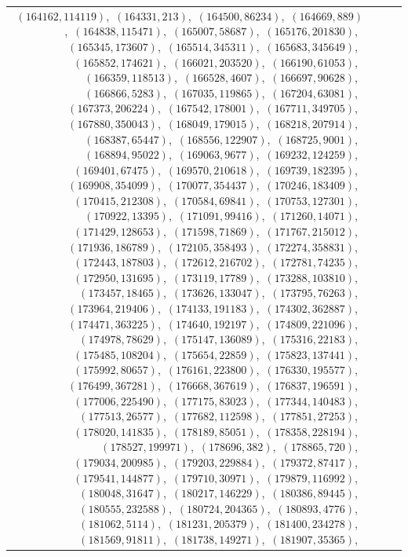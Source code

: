 \documentclass[11pt]{article}
\begin{document}
\begin{longtable}{@{}rrl>{\raggedright\arraybackslash}p{}@{}}
$(164162,114119)$,\allowbreak\ $(164331,213)$,\allowbreak\ $(164500,86234)$,\allowbreak\ $(164669,889)$,\allowbreak\ $(164838,115471)$,\allowbreak\ $(165007,58687)$,\allowbreak\ $(165176,201830)$,\allowbreak\ $(165345,173607)$,\allowbreak\ $(165514,345311)$,\allowbreak\ $(165683,345649)$,\allowbreak\ $(165852,174621)$,\allowbreak\ $(166021,203520)$,\allowbreak\ $(166190,61053)$,\allowbreak\ $(166359,118513)$,\allowbreak\ $(166528,4607)$,\allowbreak\ $(166697,90628)$,\allowbreak\ $(166866,5283)$,\allowbreak\ $(167035,119865)$,\allowbreak\ $(167204,63081)$,\allowbreak\ $(167373,206224)$,\allowbreak\ $(167542,178001)$,\allowbreak\ $(167711,349705)$,\allowbreak\ $(167880,350043)$,\allowbreak\ $(168049,179015)$,\allowbreak\ $(168218,207914)$,\allowbreak\ $(168387,65447)$,\allowbreak\ $(168556,122907)$,\allowbreak\ $(168725,9001)$,\allowbreak\ $(168894,95022)$,\allowbreak\ $(169063,9677)$,\allowbreak\ $(169232,124259)$,\allowbreak\ $(169401,67475)$,\allowbreak\ $(169570,210618)$,\allowbreak\ $(169739,182395)$,\allowbreak\ $(169908,354099)$,\allowbreak\ $(170077,354437)$,\allowbreak\ $(170246,183409)$,\allowbreak\ $(170415,212308)$,\allowbreak\ $(170584,69841)$,\allowbreak\ $(170753,127301)$,\allowbreak\ $(170922,13395)$,\allowbreak\ $(171091,99416)$,\allowbreak\ $(171260,14071)$,\allowbreak\ $(171429,128653)$,\allowbreak\ $(171598,71869)$,\allowbreak\ $(171767,215012)$,\allowbreak\ $(171936,186789)$,\allowbreak\ $(172105,358493)$,\allowbreak\ $(172274,358831)$,\allowbreak\ $(172443,187803)$,\allowbreak\ $(172612,216702)$,\allowbreak\ $(172781,74235)$,\allowbreak\ $(172950,131695)$,\allowbreak\ $(173119,17789)$,\allowbreak\ $(173288,103810)$,\allowbreak\ $(173457,18465)$,\allowbreak\ $(173626,133047)$,\allowbreak\ $(173795,76263)$,\allowbreak\ $(173964,219406)$,\allowbreak\ $(174133,191183)$,\allowbreak\ $(174302,362887)$,\allowbreak\ $(174471,363225)$,\allowbreak\ $(174640,192197)$,\allowbreak\ $(174809,221096)$,\allowbreak\ $(174978,78629)$,\allowbreak\ $(175147,136089)$,\allowbreak\ $(175316,22183)$,\allowbreak\ $(175485,108204)$,\allowbreak\ $(175654,22859)$,\allowbreak\ $(175823,137441)$,\allowbreak\ $(175992,80657)$,\allowbreak\ $(176161,223800)$,\allowbreak\ $(176330,195577)$,\allowbreak\ $(176499,367281)$,\allowbreak\ $(176668,367619)$,\allowbreak\ $(176837,196591)$,\allowbreak\ $(177006,225490)$,\allowbreak\ $(177175,83023)$,\allowbreak\ $(177344,140483)$,\allowbreak\ $(177513,26577)$,\allowbreak\ $(177682,112598)$,\allowbreak\ $(177851,27253)$,\allowbreak\ $(178020,141835)$,\allowbreak\ $(178189,85051)$,\allowbreak\ $(178358,228194)$,\allowbreak\ $(178527,199971)$,\allowbreak\ $(178696,382)$,\allowbreak\ $(178865,720)$,\allowbreak\ $(179034,200985)$,\allowbreak\ $(179203,229884)$,\allowbreak\ $(179372,87417)$,\allowbreak\ $(179541,144877)$,\allowbreak\ $(179710,30971)$,\allowbreak\ $(179879,116992)$,\allowbreak\ $(180048,31647)$,\allowbreak\ $(180217,146229)$,\allowbreak\ $(180386,89445)$,\allowbreak\ $(180555,232588)$,\allowbreak\ $(180724,204365)$,\allowbreak\ $(180893,4776)$,\allowbreak\ $(181062,5114)$,\allowbreak\ $(181231,205379)$,\allowbreak\ $(181400,234278)$,\allowbreak\ $(181569,91811)$,\allowbreak\ $(181738,149271)$,\allowbreak\ $(181907,35365)$,\allowbreak\ 
\end{longtable}
\end{document}
